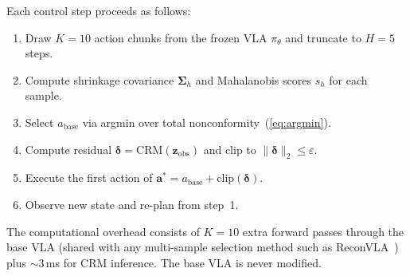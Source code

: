 Each control step proceeds as follows:
\begin{enumerate}[nosep]
  \item Draw $K{=}10$ action chunks from the frozen VLA $\pi_\theta$ and truncate to $H{=}5$ steps.
  \item Compute shrinkage covariance $\boldsymbol{\Sigma}_h$ and Mahalanobis scores $s_h$ for each sample.
  \item Select $a_{\mathrm{base}}$ via argmin over total nonconformity~(\ref{eq:argmin}).
  \item Compute residual $\boldsymbol{\delta} = \mathrm{CRM}(\mathbf{z}_{\mathrm{obs}})$ and clip to $\|\boldsymbol{\delta}\|_2 \leq \varepsilon$.
  \item Execute the first action of $\mathbf{a}^* = a_{\mathrm{base}} + \mathrm{clip}(\boldsymbol{\delta})$.
  \item Observe new state and re-plan from step~1.
\end{enumerate}
The computational overhead consists of $K{=}10$ extra forward passes through the base VLA (shared with any multi-sample selection method such as ReconVLA~\cite{chen2026reconvla}) plus ${\sim}$3\,ms for CRM inference. The base VLA is never modified.
